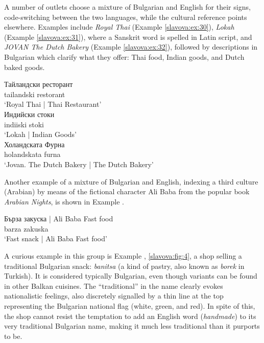 \documentclass[output=paper]{langscibook}
\begin{document}
\noindent
A number of outlets choose a mixture of Bulgarian and English for their signs, code-switching between the two languages, while the cultural reference points elsewhere. Examples include \textit{Royal Thai} (Example \ref{slavova:ex:30}), \textit{Lokah} (Example \ref{slavova:ex:31}), where a Sanskrit word is spelled in Latin script, and \textit{JOVAN The Dutch Bakery} (Example \ref{slavova:ex:32}), followed by descriptions in Bulgarian which clarify what they offer: Thai food, Indian goods, and Dutch baked goods.

\begin{exe}
  \ex\label{slavova:ex:30}
   Тайландски ресторант \\
  { } tailandski restorant \\
  \glt ‘Royal Thai | Thai Restaurant’ \\
  \ex\label{slavova:ex:31}
   Индийски стоки \\
  { } indiiski stoki \\
  \glt ‘Lokah | Indian Goods’ \\
  \ex\label{slavova:ex:32}
   Холандската Фурна \\
  { } holandskata furna \\
  \glt ‘Jovan. The Dutch Bakery | The Dutch Bakery’
\end{exe}


Another example of a mixture of Bulgarian and English, indexing a third culture (Arabian) by means of the fictional character Ali Baba from the popular book \textit{Arabian Nights}, is shown in Example .

\begin{exe}
  \ex\label{slavova:ex:33}
  \gll Бърза закуска {| Ali Baba Fast food} \\
  barza zakuska { } \\
  \glt ‘Fast snack | Ali Baba Fast food’
\end{exe}


A curious example in this group is Example , \autoref{slavova:fig:4}, a shop selling a traditional Bulgarian snack: \textit{banitsa} (a kind of pastry, also known as \textit{borek} in Turkish). It is considered typically Bulgarian, even though variants can be found in other Balkan cuisines. The “traditional” in the name clearly evokes nationalistic feelings, also discretely signalled by a thin line at the top representing the Bulgarian national flag (white, green, and red). In spite of this, the shop cannot resist the temptation to add an English word (\textit{handmade}) to its very traditional Bulgarian name, making it much less traditional than it purports to be.
\end{document}
